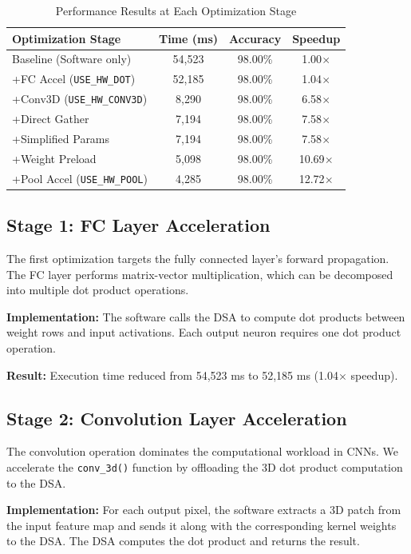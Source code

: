 \documentclass[conference]{IEEEtran}
\begin{document}
\begin{table}[htbp]
\caption{Performance Results at Each Optimization Stage}
\label{tab:results}
\centering
\begin{tabular}{@{}lccc@{}}
\toprule
Optimization Stage & Time (ms) & Accuracy & Speedup \\
\midrule
Baseline (Software only) & 54,523 & 98.00\% & 1.00$\times$ \\
+FC Accel (\texttt{USE\_HW\_DOT}) & 52,185 & 98.00\% & 1.04$\times$ \\
+Conv3D (\texttt{USE\_HW\_CONV3D}) & 8,290 & 98.00\% & 6.58$\times$ \\
+Direct Gather & 7,194 & 98.00\% & 7.58$\times$ \\
+Simplified Params & 7,194 & 98.00\% & 7.58$\times$ \\
+Weight Preload & 5,098 & 98.00\% & 10.69$\times$ \\
+Pool Accel (\texttt{USE\_HW\_POOL}) & 4,285 & 98.00\% & 12.72$\times$ \\
\bottomrule
\end{tabular}
\end{table}

\subsection{Stage 1: FC Layer Acceleration }

The first optimization targets the fully connected layer's forward propagation. The FC layer performs matrix-vector multiplication, which can be decomposed into multiple dot product operations.

\textbf{Implementation:} The software calls the DSA to compute dot products between weight rows and input activations. Each output neuron requires one dot product operation.

\textbf{Result:} Execution time reduced from 54,523 ms to 52,185 ms (1.04$\times$ speedup). 

\subsection{Stage 2: Convolution Layer Acceleration }

The convolution operation dominates the computational workload in CNNs. We accelerate the \texttt{conv\_3d()} function by offloading the 3D dot product computation to the DSA.

\textbf{Implementation:} For each output pixel, the software extracts a 3D patch from the input feature map and sends it along with the corresponding kernel weights to the DSA. The DSA computes the dot product and returns the result.
\end{document}
